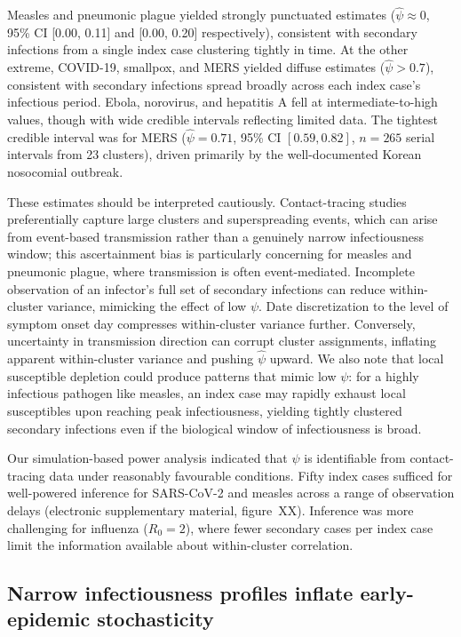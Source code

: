 \documentclass[10pt]{article}
\begin{document}
Measles and pneumonic plague yielded strongly punctuated estimates ($\hat{\psi} \approx 0$, 95\% CI [0.00, 0.11] and [0.00, 0.20] respectively), consistent with secondary infections from a single index case clustering tightly in time. At the other extreme, COVID-19, smallpox, and MERS yielded diffuse estimates ($\hat{\psi} > 0.7$), consistent with secondary infections spread broadly across each index case's infectious period. Ebola, norovirus, and hepatitis A fell at intermediate-to-high values, though with wide credible intervals reflecting limited data. The tightest credible interval was for MERS ($\hat{\psi} = 0.71$, 95\% CI $[0.59, 0.82]$, $n = 265$ serial intervals from 23 clusters), driven primarily by the well-documented Korean nosocomial outbreak.

These estimates should be interpreted cautiously. Contact-tracing studies preferentially capture large clusters and superspreading events, which can arise from event-based transmission rather than a genuinely narrow infectiousness window; this ascertainment bias is particularly concerning for measles and pneumonic plague, where transmission is often event-mediated. Incomplete observation of an infector's full set of secondary infections can reduce within-cluster variance, mimicking the effect of low $\psi$. Date discretization to the level of symptom onset day compresses within-cluster variance further. Conversely, uncertainty in transmission direction can corrupt cluster assignments, inflating apparent within-cluster variance and pushing $\hat{\psi}$ upward. We also note that local susceptible depletion could produce patterns that mimic low $\psi$: for a highly infectious pathogen like measles, an index case may rapidly exhaust local susceptibles upon reaching peak infectiousness, yielding tightly clustered secondary infections even if the biological window of infectiousness is broad.

Our simulation-based power analysis indicated that $\psi$ is identifiable from contact-tracing data under reasonably favourable conditions. Fifty index cases sufficed for well-powered inference for SARS-CoV-2 and measles across a range of observation delays (electronic supplementary material, figure~XX). Inference was more challenging for influenza ($R_0 = 2$), where fewer secondary cases per index case limit the information available about within-cluster correlation.

\subsection{Narrow infectiousness profiles inflate early-epidemic stochasticity}
\end{document}
